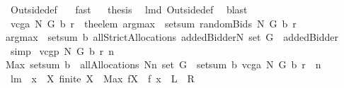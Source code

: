 \begin{isabellebody}
\ Outside{\isacharunderscore}def\ {}\ \isamarkupfalse%
\ fast\isanewline
{}\isamarkupfalse%
\ \isamarkupfalse%
\ {\isacharquery}thesis\ \isamarkupfalse%
\ lm{}{}d\ Outside{\isacharunderscore}def\ \isamarkupfalse%
\ blast\isanewline
{}\isamarkupfalse%
%
\endisatagproof
{\isafoldproof}%
%
\isadelimproof
%
\endisadelimproof
\isanewline
\isanewline
{}\isamarkupfalse%
\ {\isachardoublequoteopen}vcga{\isacharprime}\ N\ G\ b\ r\ {\isacharequal}\ the{\isacharunderscore}elem\ {\isacharparenleft}{\isacharparenleft}argmax\ {\isasymcirc}\ setsum{\isacharparenright}\ {\isacharparenleft}randomBids{\isacharprime}\ N\ G\ b\ r{\isacharparenright}\ \isanewline
{\isacharparenleft}{\isacharparenleft}argmax\ {\isasymcirc}\ setsum{\isacharparenright}\ b\ {\isacharparenleft}allStrictAllocations{\isacharprime}\ {\isacharparenleft}{\isacharbraceleft}addedBidder{\isacharprime}{\isacharbraceright}{\isasymunion}N{\isacharparenright}\ {\isacharparenleft}set\ G{\isacharparenright}{\isacharparenright}{\isacharparenright}{\isacharparenright}\ {\isacharminus}{\isacharminus}\ addedBidder{\isacharprime}{\isachardoublequoteclose}%
\isadelimproof
\ %
\endisadelimproof
%
\isatagproof
{}\isamarkupfalse%
\ simp%
\endisatagproof
{\isafoldproof}%
%
\isadelimproof
%
\endisadelimproof
\isanewline
\isanewline
{}\isamarkupfalse%
\ {\isachardoublequoteopen}vcgp{\isacharprime}\ N\ G\ b\ r\ n\ {\isacharequal}{\isacharequal}\isanewline
Max\ {\isacharparenleft}setsum\ b\ {\isacharbackquote}\ {\isacharparenleft}allAllocations{\isacharprime}\ {\isacharparenleft}N{\isacharminus}{\isacharbraceleft}n{\isacharbraceright}{\isacharparenright}\ {\isacharparenleft}set\ G{\isacharparenright}{\isacharparenright}{\isacharparenright}\ {\isacharminus}\ {\isacharparenleft}setsum\ b\ {\isacharparenleft}vcga{\isacharprime}\ N\ G\ b\ r\ {\isacharminus}{\isacharminus}\ n{\isacharparenright}{\isacharparenright}{\isachardoublequoteclose}\isanewline
\isanewline
{}\isamarkupfalse%
\ lm{}{}{\isacharcolon}\ \ {\isachardoublequoteopen}x\ {\isasymin}\ X{\isachardoublequoteclose}\ {\isachardoublequoteopen}finite\ X{\isachardoublequoteclose}\ \ {\isachardoublequoteopen}Max\ {\isacharparenleft}f{\isacharbackquote}X{\isacharparenright}\ {\isachargreater}{\isacharequal}\ f\ x{\isachardoublequoteclose}\ {\isacharparenleft}\ {\isachardoublequoteopen}{\isacharquery}L\ {\isachargreater}{\isacharequal}\ {\isacharquery}R{\isachardoublequoteclose}{\isacharparenright}%

\end{isabellebody}
